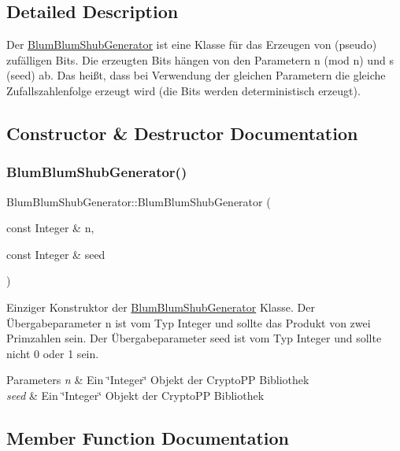 \subsection{Detailed Description}
Der \hyperlink{classBlumBlumShubGenerator}{Blum\+Blum\+Shub\+Generator} ist eine Klasse für das Erzeugen von (pseudo) zufälligen Bits. Die erzeugten Bits hängen von den Parametern n (mod n) und s (seed) ab. Das heißt, dass bei Verwendung der gleichen Parametern die gleiche Zufallszahlenfolge erzeugt wird (die Bits werden deterministisch erzeugt). 

\subsection{Constructor \& Destructor Documentation}
\mbox{\label{classBlumBlumShubGenerator_ae4bb31e199365075f38783d82f5dd74f}} 
\subsubsection{\texorpdfstring{Blum\+Blum\+Shub\+Generator()}{BlumBlumShubGenerator()}}
{\footnotesize\ttfamily Blum\+Blum\+Shub\+Generator\+::\+Blum\+Blum\+Shub\+Generator (\begin{DoxyParamCaption}\item[{const Integer \&}]{n,  }\item[{const Integer \&}]{seed }\end{DoxyParamCaption})}

Einziger Konstruktor der \hyperlink{classBlumBlumShubGenerator}{Blum\+Blum\+Shub\+Generator} Klasse. Der Übergabeparameter n ist vom Typ Integer und sollte das Produkt von zwei Primzahlen sein. Der Übergabeparameter seed ist vom Typ Integer und sollte nicht 0 oder 1 sein.


\begin{DoxyParams}{Parameters}
{\em n} & Ein \char`\"{}\+Integer\char`\"{} Objekt der Crypto\+PP Bibliothek\\
\hline
{\em seed} & Ein \char`\"{}\+Integer\char`\"{} Objekt der Crypto\+PP Bibliothek \\
\hline
\end{DoxyParams}


\subsection{Member Function Documentation}
\mbox{\label{classBlumBlumShubGenerator_aa25d1b6bc4686e6fecd254877b472d39}} 
